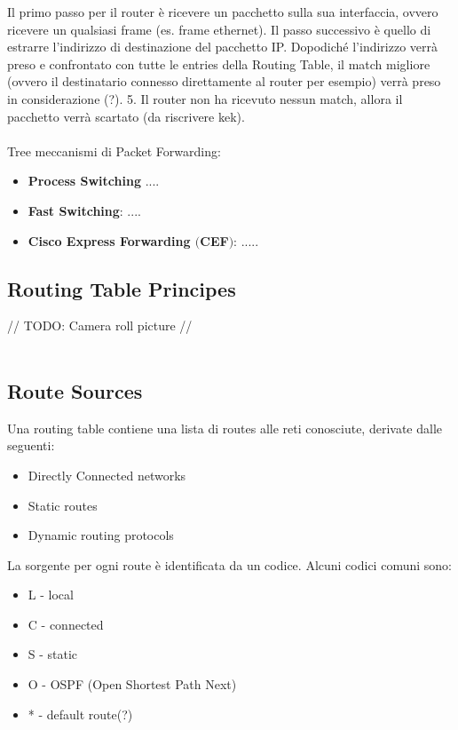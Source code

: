 \documentclass[12pt, a4paper]{article}
\begin{document}
	Il primo passo per il router è ricevere un pacchetto sulla sua interfaccia, ovvero ricevere un qualsiasi frame (es. frame ethernet). Il passo successivo è quello di estrarre l'indirizzo di destinazione del pacchetto IP. Dopodiché l'indirizzo verrà preso e confrontato con tutte le entries della Routing Table, il match migliore (ovvero il destinatario connesso direttamente al router per esempio) verrà preso in considerazione (?). 5. Il router non ha ricevuto nessun match, allora il pacchetto verrà scartato (da riscrivere kek). \\ \\
	Tree meccanismi di Packet Forwarding:
	\begin{itemize}
		\item \textbf{Process Switching} ....
		\item \textbf{Fast Switching}: ....
		\item \textbf{Cisco Express Forwarding $($CEF$)$}: .....
	\end{itemize}
	
	\subsection*{Routing Table Principes}
	// TODO: Camera roll picture // \\ \\
	
	\subsection*{Route Sources}
	Una routing table contiene una lista di routes alle reti conosciute, derivate dalle seguenti:
	\begin{itemize}
		\item Directly Connected networks
		\item Static routes
		\item Dynamic routing protocols
	\end{itemize}

	La sorgente per ogni route è identificata da un codice. Alcuni codici comuni sono:
	\begin{itemize}
		\item L - local
		\item C - connected
		\item S - static
		\item O - OSPF (Open Shortest Path Next)
		\item * - default route(?)
	\end{itemize}
\end{document}
